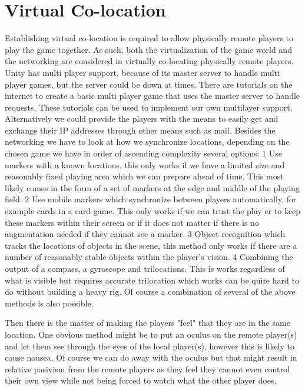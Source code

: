 \section{Virtual Co-location} \label{sec:virtualcolocation}
Establishing virtual co-location is required to allow physically remote players
		to play the game together. As such, both the virtualization of the game world and
		the networking are considered in virtually co-locating physically remote players.
		Unity has multi player support, because of its master server to handle multi player
		games, but the server could be down at times. There are tutorials on the internet
		to create a basic multi player game that uses the master server to handle requests.
		These tutorials can be used to implement our own multilayer support. Alternatively
		we could provide the players with the means to easily get and exchange their IP
		addresses through other means such as mail. 
		Besides the networking we have to look at how we synchronize locations, depending on
		the chosen game we have in order of ascending complexity several options:
		1 Use markers with a known locations, this only works if we have a limited size 
		and reasonably fixed playing area which we can prepare ahead of time. This most 
		likely comes in the form of a set of markers at the edge and middle of the playing 
		field. 
		2 Use mobile markers which synchronize between players automatically, for example
		cards in a card game. This only works if we can trust the play er to keep these markers
		within their screen or if it does not matter if there is no augmentation needed if they
		cannot see a marker. 
		3 Object recognition which tracks the locations of objects in the scene,
		this method only works if there are a number of reasonably stable objects 
		within the player's vision. 
		4 Combining the output of a compass, a gyroscope and trilocations. This is 
		works regardless of what is visible but requires accurate trilocation which works
		can be quite hard to do without building a heavy rig. 
		Of course a combination of several of the above methods is also possible. 

		Then there is the matter of making the players "feel" that they are in the 
		same location. One obvious method might be to put an oculus on the remote player(s) and let 
		them see through the eyes of the local player(s), however this is likely to cause nausea. 
		Of course we can do away with the oculus but that might result in relative pasivism from 
		the remote players as they feel they cannot 
		even control their own view while not being forced to watch what the other player does. 

